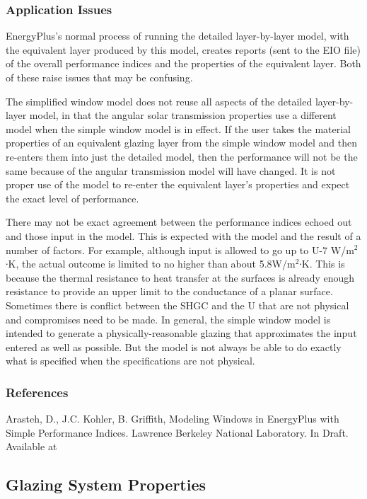 \subsubsection{Application Issues}\label{application-issues}

EnergyPlus's normal process of running the detailed layer-by-layer model, with the equivalent layer produced by this model, creates reports (sent to the EIO file) of the overall performance indices and the properties of the equivalent layer. Both of these raise issues that may be confusing.

The simplified window model does not reuse all aspects of the detailed layer-by-layer model, in that the angular solar transmission properties use a different model when the simple window model is in effect. If the user takes the material properties of an equivalent glazing layer from the simple window model and then re-enters them into just the detailed model, then the performance will not be the same because of the angular transmission model will have changed. It is not proper use of the model to re-enter the equivalent layer's properties and expect the exact level of performance.

There may not be exact agreement between the performance indices echoed out and those input in the model. This is expected with the model and the result of a number of factors. For example, although input is allowed to go up to U-7 W/m\(^{2}\)∙K, the actual outcome is limited to no higher than about 5.8W/m\(^{2}\)∙K. This is because the thermal resistance to heat transfer at the surfaces is already enough resistance to provide an upper limit to the conductance of a planar surface. Sometimes there is conflict between the SHGC and the U that are not physical and compromises need to be made. In general, the simple window model is intended to generate a physically-reasonable glazing that approximates the input entered as well as possible. But the model is not always be able to do exactly what is specified when the specifications are not physical.

\subsubsection{References}\label{references-054}

Arasteh, D., J.C. Kohler, B. Griffith, Modeling Windows in EnergyPlus with Simple Performance Indices. Lawrence Berkeley National Laboratory. In Draft. Available at

\subsection{Glazing System Properties}\label{glazing-system-properties}

